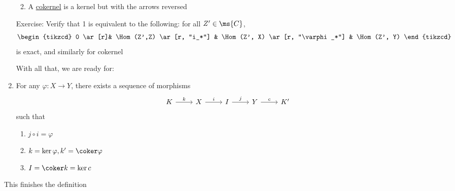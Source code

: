 \documentclass[x11names,reqno,14pt]{extarticle}
\begin{document}
\begin{enumerate}
\begin{enumerate}
\begin{enumerate}[label=(\alph*)]
\end{enumerate}

\item A \underline{cokernel} is a kernel but with the arrows reversed

\end{enumerate}

Exercise: Verify that 1 is equivalent to the following: for all $Z'\in\ms{C}$, 
\[
\begin{tikzcd}
0 \ar[r]& \Hom(Z',Z) \ar[r, "i_*"] & \Hom(Z', X) \ar[r, "\varphi_*"] & \Hom(Z', Y) 
\end{tikzcd}
\]
is exact, and similarly for cokernel

With all that, we are ready for: 

\item For any $\varphi:X\to Y$, there exists a sequence of morphisms 
\[
\begin{tikzcd}
K\ar[r, "k"] & X \ar[r, "i"] & I \ar[r, "j"] & Y \ar[r, "c"] & K'
\end{tikzcd}
\]
such that
\begin{enumerate}[label=(\alph*)]

\item $j\circ i = \varphi$

\item $k = \ker \varphi, k' = \coker\varphi$

\item $I = \coker k = \ker c$

\end{enumerate}

\end{enumerate}

This finishes the definition
\end{document}
